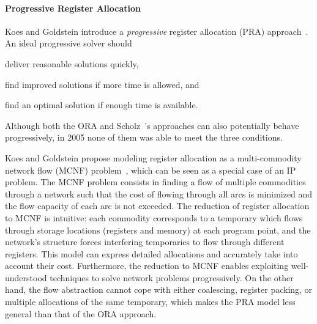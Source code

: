 \documentclass[acmsmall,authorversion,nonacm]{acmart}
\begin{document}
\paragraph{Progressive Register Allocation}
Koes and Goldstein introduce a \emph{progressive} register allocation
(PRA) approach~\cite{Koes2005,Koes2006}.
An ideal progressive solver should
\begin{inparaitem}[]
\item deliver reasonable solutions quickly,
\item find improved solutions if more time is allowed, and
\item find an optimal solution if enough time is available.
\end{inparaitem}
Although both the ORA and Scholz~\etal{}'s approaches can also
potentially behave progressively, in 2005 none of them was able to
meet the three conditions.

Koes and Goldstein propose modeling register allocation as a
multi-commodity network flow (MCNF) problem~\cite{Ahuja1993}, which
can be seen as a special case of an IP problem.
The MCNF problem consists in finding a flow of multiple commodities
through a network such that the cost of flowing through all arcs is
minimized and the flow capacity of each arc is not exceeded.
The reduction of register allocation to MCNF is intuitive: each
commodity corresponds to a temporary which flows through storage
locations (registers and memory) at each program point, and the
network's structure forces interfering temporaries to flow through
different registers.
This model can express detailed allocations and accurately take into
account their cost.
Furthermore, the reduction to MCNF enables exploiting well-understood
techniques to solve network problems progressively.
On the other hand, the flow abstraction cannot cope with either
coalescing, register packing, or multiple allocations of the same
temporary, which makes the PRA model less general than that of the ORA
approach.
\end{document}
